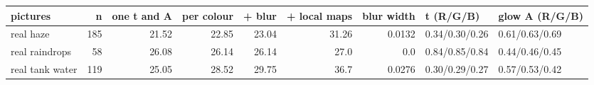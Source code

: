 \begin{tabular}{lrrrrrrll}
\toprule
pictures & n & one t and A & per colour & + blur & + local maps & blur width & t (R/G/B) & glow A (R/G/B) \\
\midrule
real haze & 185 & 21.52 & 22.85 & 23.04 & 31.26 & 0.0132 & 0.34/0.30/0.26 & 0.61/0.63/0.69 \\
real raindrops & 58 & 26.08 & 26.14 & 26.14 & 27.0 & 0.0 & 0.84/0.85/0.84 & 0.44/0.46/0.45 \\
real tank water & 119 & 25.05 & 28.52 & 29.75 & 36.7 & 0.0276 & 0.30/0.29/0.27 & 0.57/0.53/0.42 \\
\bottomrule
\end{tabular}
